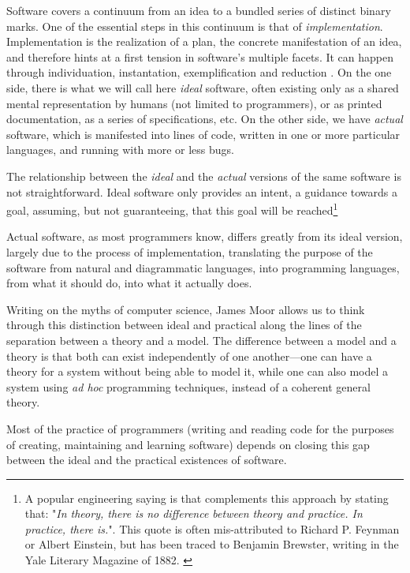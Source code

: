 Software covers a continuum from an idea to a bundled series of distinct binary marks. One of the essential steps in this continuum is that of \emph{implementation}. Implementation is the realization of a plan, the concrete manifestation of an idea, and therefore hints at a first tension in software's multiple facets. It can happen through individuation, instantation, exemplification and reduction \citep{rapaport_philosophy_2005}. On the one side, there is what we will call here \emph{ideal} software, often existing only as a shared mental representation by humans (not limited to programmers), or as printed documentation, as a series of specifications, etc. On the other side, we have \emph{actual} software, which is manifested into lines of code, written in one or more particular languages, and running with more or less bugs.

The relationship between the \emph{ideal} and the \emph{actual} versions of the same software is not straightforward. Ideal software only provides an intent, a guidance towards a goal, assuming, but not guaranteeing, that this goal will be reached\footnote{A popular engineering saying is that complements this approach by stating that: "\emph{In theory, there is no difference between theory and practice. In practice, there is.}". This quote is often mis-attributed to Richard P. Feynman or Albert Einstein, but has been traced to Benjamin Brewster, writing in the Yale Literary Magazine of 1882. \citep{quoteinvestigator_theory_2018}}

Actual software, as most programmers know, differs greatly from its ideal version, largely due to the process of implementation, translating the purpose of the software from natural and diagrammatic languages, into programming languages, from what it should do, into what it actually does.

Writing on the myths of computer science, James Moor \citep{moor_three_1978} allows us to think through this distinction between ideal and practical along the lines of the separation between a theory and a model. The difference between a model and a theory is that both can exist independently of one another—one can have a theory for a system without being able to model it, while one can also model a system using \emph{ad hoc} programming techniques, instead of a coherent general theory.

Most of the practice of programmers (writing and reading code for the purposes of creating, maintaining and learning software) depends on closing this gap between the ideal and the practical existences of software.

